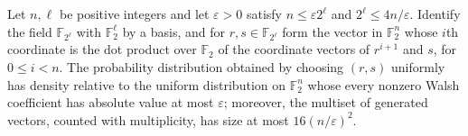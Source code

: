 \begin{theorem}
\label{FABL.smallBiasGenerator_core}
\leanok
{}
Let $n,\ell$ be positive integers and let $\varepsilon>0$ satisfy $n\leq \varepsilon
2^\ell$ and $2^\ell\leq 4n/\varepsilon$. Identify the field $\mathbb{F}_{2^\ell}$ with
$\mathbb{F}_2^\ell$ by a basis, and for $r,s\in\mathbb{F}_{2^\ell}$ form the vector in
$\mathbb{F}_2^n$ whose $i$th coordinate is the dot product over $\mathbb{F}_2$ of the
coordinate vectors of $r^{i+1}$ and $s$, for $0\leq i<n$. The probability distribution
obtained by choosing $(r,s)$ uniformly has density relative to the uniform distribution
on $\mathbb{F}_2^n$ whose every nonzero Walsh coefficient has absolute value at most
$\varepsilon$; moreover, the multiset of generated vectors, counted with multiplicity,
has size at most $16(n/\varepsilon)^2$.
\end{theorem}
